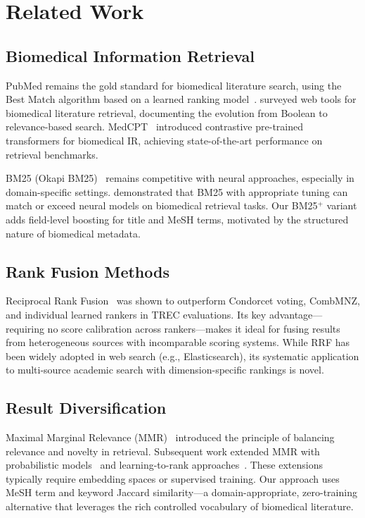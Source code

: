\documentclass[11pt,a4paper]{article}
\begin{document}
\section{Related Work}
\label{sec:related}

\subsection{Biomedical Information Retrieval}

PubMed remains the gold standard for biomedical literature search, using the Best Match algorithm based on a learned ranking model~\citep{fiorini2018best}.
\citet{lu2011pubmed} surveyed web tools for biomedical literature retrieval, documenting the evolution from Boolean to relevance-based search.
MedCPT~\citep{jin2023medcpt} introduced contrastive pre-trained transformers for biomedical IR, achieving state-of-the-art performance on retrieval benchmarks.

BM25 (Okapi BM25)~\citep{robertson2009bm25} remains competitive with neural approaches, especially in domain-specific settings.
\citet{lin2021bm25} demonstrated that BM25 with appropriate tuning can match or exceed neural models on biomedical retrieval tasks.
Our BM25$^{+}$ variant adds field-level boosting for title and MeSH terms, motivated by the structured nature of biomedical metadata.

\subsection{Rank Fusion Methods}

Reciprocal Rank Fusion~\citep{cormack2009rrf} was shown to outperform Condorcet voting, CombMNZ, and individual learned rankers in TREC evaluations.
Its key advantage---requiring no score calibration across rankers---makes it ideal for fusing results from heterogeneous sources with incomparable scoring systems.
While RRF has been widely adopted in web search (e.g., Elasticsearch), its systematic application to multi-source academic search with dimension-specific rankings is novel.

\subsection{Result Diversification}

Maximal Marginal Relevance (MMR)~\citep{carbonell1998mmr} introduced the principle of balancing relevance and novelty in retrieval.
Subsequent work extended MMR with probabilistic models~\citep{li2010probabilistic} and learning-to-rank approaches~\citep{xia2015mmr}.
These extensions typically require embedding spaces or supervised training.
Our approach uses MeSH term and keyword Jaccard similarity---a domain-appropriate, zero-training alternative that leverages the rich controlled vocabulary of biomedical literature.
\end{document}
